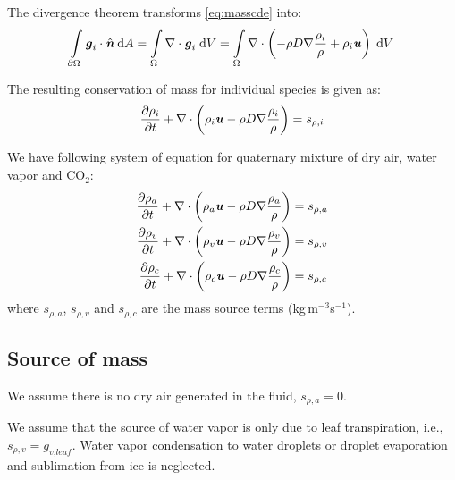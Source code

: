 The divergence theorem transforms \ref{eq:masscde} into:
\begin{equation}
\int \limits_{\partial \Omega } {{{\textbf{\textit{g}}}_i}}  \cdot \hat{\textbf{\textit{n}}}\:\mathrm{d}A = \int \limits_\Omega  \nabla  \cdot {{\textbf{\textit{g}}}_i}\;\mathrm{d}V = \int \limits_\Omega  \nabla  \cdot \left( { - \rho D\nabla \frac{{{\rho _i}}}{{{\rho }}} + {\rho _i}{\textbf{\textit{u}}}} \right)\;\mathrm{d}V
\end{equation}

The resulting conservation of mass for individual species is given as:
\begin{equation}
\frac{{\partial {\rho _i}}}{{\partial t}} + \nabla  \cdot \left( {{\rho _i}{\textbf{\textit{u}}} - {\rho}{D}\nabla \frac{{{\rho _i}}}{{{\rho}}}} \right) = {s_{\rho ,i}}
\end{equation}

We have following system of equation for quaternary mixture of dry air, water vapor and CO$_2$:
\begin{align}
\frac{{\partial {\rho _a}}}{{\partial t}} + \nabla  \cdot \left( {{\rho _a}{\textbf{\textit{u}}} - {\rho }{D}\nabla \frac{{{\rho _a}}}{{{\rho }}}} \right) &= {s_{\rho ,a}} \label{eq:comaa}\\
\frac{{\partial {\rho _v}}}{{\partial t}} + \nabla  \cdot \left( {{\rho _v}{\textbf{\textit{u}}} - {\rho }{D}\nabla \frac{{{\rho _v}}}{{{\rho }}}} \right) &= {s_{\rho ,v}} \label{eq:comvv}\\
\frac{{\partial {\rho _{c}}}}{{\partial t}} + \nabla  \cdot \left( {{\rho _{c}}{\textbf{\textit{u}}} - {\rho }{D}\nabla \frac{{{\rho _{c}}}}{{{\rho }}}} \right) &= {s_{\rho ,{c}}}
\end{align}
where ${s_{\rho ,a}}$, ${s_{\rho ,v}}$ and ${s_{\rho ,c}}$ are the mass source terms (kg\,m$^{-3}$s$^{-1}$).

\subsection{Source of mass}

\begin{assumption}
	We assume there is no dry air generated in the fluid, ${s_{\rho ,a}} = 0$. 
\end{assumption}

\begin{assumption}
	We assume that the source of water vapor is only due to leaf transpiration, i.e., $s_{\rho,v} = g_{\textit{v,leaf}}$. Water vapor condensation to water droplets or droplet evaporation and sublimation from ice is neglected.
\end{assumption}

